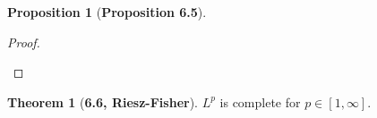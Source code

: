 \documentclass[12pt]{article}
\theoremstyle{definition}
\newtheorem*{thm}{Theorem}
\newtheorem*{prop}{Proposition}
\begin{document}
\begin{prop}[\textbf{Proposition 6.5}]
\begin{proof}
\begin{enumerate}
            \end{enumerate}
    \end{proof}
    
\end{prop}

\begin{thm}[\textbf{6.6, Riesz-Fisher}]

    \( L^p \) is complete for \( p \in [1, \infty] \).
    
\end{thm}
\end{document}
